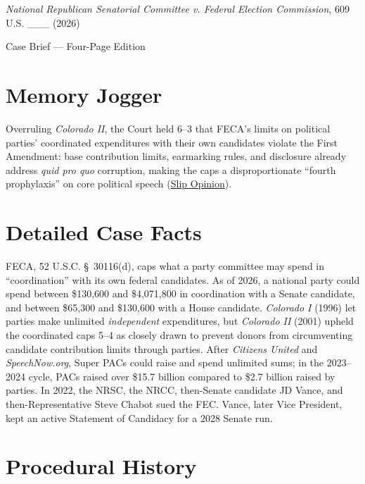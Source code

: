 \documentclass[12pt]{article}
\begin{document}
\begin{center}
{\LARGE \textit{National Republican Senatorial Committee v. Federal Election Commission}, 609 U.S. \_\_\_ (2026)\par}
\vspace{0.8em}
{\large Case Brief --- Four-Page Edition\par}
\end{center}
\vspace{1em}

\section{Memory Jogger}

Overruling \textit{Colorado II}, the Court held 6--3 that FECA's limits on political parties' coordinated expenditures with their own candidates violate the First Amendment: base contribution limits, earmarking rules, and disclosure already address \textit{quid pro quo} corruption, making the caps a disproportionate ``fourth prophylaxis'' on core political speech (\href{https://www.supremecourt.gov/opinions/25pdf/24-621_h315.pdf}{Slip Opinion}).

\section{Detailed Case Facts}

FECA, 52 U.S.C. \S~30116(d), caps what a party committee may spend in ``coordination'' with its own federal candidates. As of 2026, a national party could spend between \$130,600 and \$4,071,800 in coordination with a Senate candidate, and between \$65,300 and \$130,600 with a House candidate. \textit{Colorado I} (1996) let parties make unlimited \textit{independent} expenditures, but \textit{Colorado II} (2001) upheld the coordinated caps 5--4 as closely drawn to prevent donors from circumventing candidate contribution limits through parties. After \textit{Citizens United} and \textit{SpeechNow.org}, Super PACs could raise and spend unlimited sums; in the 2023--2024 cycle, PACs raised over \$15.7 billion compared to \$2.7 billion raised by parties. In 2022, the NRSC, the NRCC, then-Senate candidate JD Vance, and then-Representative Steve Chabot sued the FEC. Vance, later Vice President, kept an active Statement of Candidacy for a 2028 Senate run.

\section{Procedural History}
\end{document}
